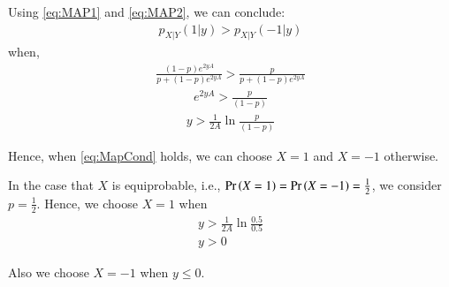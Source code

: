 \documentclass[journal,12pt,twocolumn]{IEEEtran}
\renewcommand\thesection{\arabic{section}}
\begin{document}
\begin{enumerate}[label=\thesection.\arabic*
,ref=\thesection.\theenumi]
	Using \eqref{eq:MAP1} and \eqref{eq:MAP2}, we can conclude:
	\begin{align}
		p_{X|Y}(1|y) > p_{X|Y}(-1|y)
	\end{align}
	when,
	\begin{align}
		\frac{\left(1-p\right) e^{2yA}}{p + \left(1-p\right) e^{2yA}} > \frac{p}{p + \left(1-p\right) e^{2yA}}
	\end{align}
	\begin{align}
		e^{2yA} > \frac{p}{\left(1-p\right)}
	\end{align}
	\begin{align}
		y > \frac{1}{2A} \ln{\frac{p}{\left(1-p\right)}}
		\label{eq:MapCond}
	\end{align}

	Hence, when \eqref{eq:MapCond} holds, we can choose $X = 1$ and $X = -1$ otherwise.

	In the case that $X$ is equiprobable, i.e., $\Pr\left(X = 1\right) = \Pr\left(X = -1\right) = \frac{1}{2}$, we consider $p = \frac{1}{2}$.
	Hence, we choose $X = 1$ when
	\begin{align}
		y > \frac{1}{2A} \ln{\frac{0.5}{0.5}} \\
		y > 0
	\end{align}

	Also we choose $X = -1$ when $y \leq 0$.

\end{enumerate}
\end{document}
